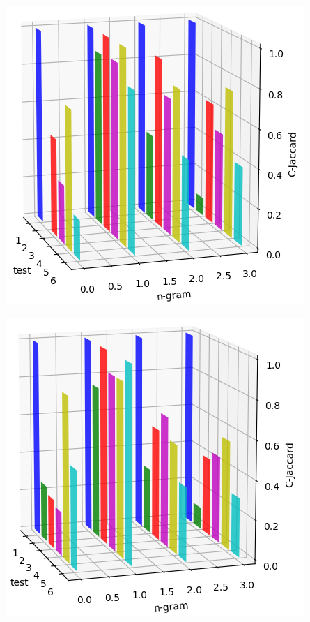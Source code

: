 \documentclass{article}
\begin{document}
\begin{center}
\begin{minipage}{0.48\linewidth}
    \includegraphics[width=\linewidth]{img/jc_9K.png}
\end{minipage}%
\hfill
\begin{minipage}{0.48\linewidth}
    \includegraphics[width=\linewidth]{img/jc_60K.png}

\end{minipage}
\end{center}
\end{document}
